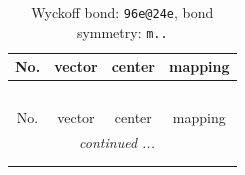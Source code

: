 \documentclass[fleqn,8pt]{jsarticle}
\begin{document}
\renewcommand{\arraystretch}{1.2}
\begin{longtable}{cccc}
\caption{Wyckoff bond: {\tt 96e@24e}, bond symmetry: {\tt m..}}
 \\
 \hline \hline
No. & vector & center & mapping \\ \hline \endfirsthead

\multicolumn{3}{l}{\tablename\ \thetable{}} \\
 \hline \hline
No. & vector & center & mapping \\ \hline \endhead

 \hline \hline
\multicolumn{3}{r}{\footnotesize\it continued ...} \\ \endfoot

 \hline \hline
\multicolumn{3}{r}{} \\ \endlastfoot


\end{longtable}
\end{document}
